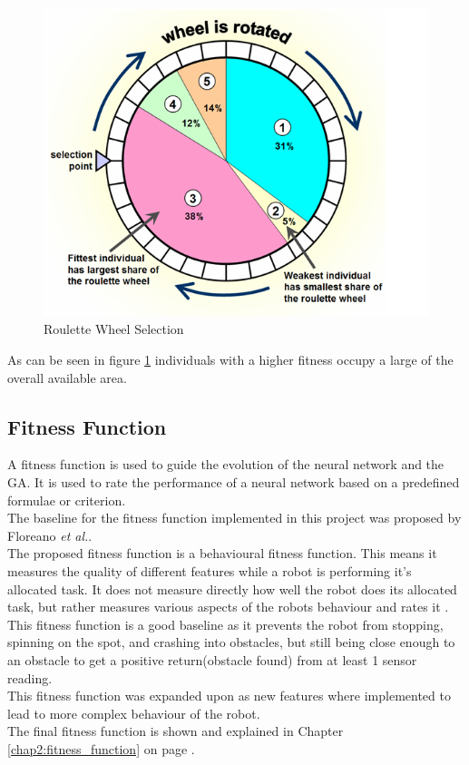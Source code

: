 \begin{figure}[h]
\begin{center}
\includegraphics[scale=0.4]{Chapter1/images/roulette_wheel.png} 
\caption[Roulette Wheel Selection]{Roulette Wheel Selection\footnotemark}
\label{fig:selection}
\end{center}
\end{figure} 


As can be seen in figure \ref{fig:selection} individuals with a higher fitness occupy a large of the overall available area. \\

\subsection{Fitness Function}
A fitness function is used to guide the evolution of the neural network and the GA. It is used to rate the performance of a neural network based on a predefined formulae or criterion.\\
The baseline for the fitness function implemented in this project was proposed by Floreano \textit{et al.}\cite{499791}. \\
The proposed fitness function is a behavioural fitness function. This means it measures the quality of different features while a robot is performing it's allocated task. It does not measure directly how well the robot does its allocated task, but rather measures various aspects of the robots behaviour and rates it \cite{Nelson2009Fitness}.
This fitness function is a good baseline as it prevents the robot from stopping, spinning on the spot, and crashing into obstacles, but still being close enough to an obstacle to get a positive return(obstacle found) from at least 1 sensor reading. \\
This fitness function was expanded upon as new features where implemented to lead to more complex behaviour of the robot.\\
The final fitness function is shown and explained in Chapter \ref{chap2:fitness_function} on page \pageref{chap2:fitness_function}.

